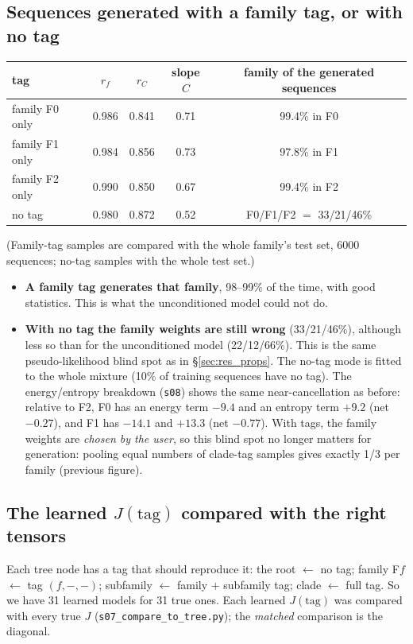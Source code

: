 \subsection{Sequences generated with a family tag, or with no tag}
\begin{center}\small
\begin{tabular}{lccccc}
\toprule
tag & $r_f$ & $r_C$ & slope $C$ & \multicolumn{2}{c}{family of the generated sequences}\\
\midrule
family F0 only & 0.986 & 0.841 & 0.71 & \multicolumn{2}{c}{99.4\% in F0}\\
family F1 only & 0.984 & 0.856 & 0.73 & \multicolumn{2}{c}{97.8\% in F1}\\
family F2 only & 0.990 & 0.850 & 0.67 & \multicolumn{2}{c}{99.4\% in F2}\\
no tag & 0.980 & 0.872 & 0.52 & \multicolumn{2}{c}{F0/F1/F2 $=$ 33/21/46\%}\\
\bottomrule
\end{tabular}
\end{center}
(Family-tag samples are compared with the whole family's test set, 6000 sequences; no-tag samples with the
whole test set.)
\begin{itemize}
\item \textbf{A family tag generates that family}, 98--99\% of the time, with good statistics. This is
      what the unconditioned model could not do.
\item \textbf{With no tag the family weights are still wrong} (33/21/46\%), although less so than for the
      unconditioned model (22/12/66\%). This is the same pseudo-likelihood blind spot as in
      \S\ref{sec:res_props}. The no-tag mode is fitted to the whole mixture (10\% of training sequences have no
      tag). The energy/entropy breakdown (\texttt{s08}) shows the same near-cancellation as before: relative to F2, F0
      has an energy term $-9.4$ and an entropy term $+9.2$ (net $-0.27$), and F1 has $-14.1$ and $+13.3$ (net
      $-0.77$). With tags, the family weights are \emph{chosen by the user}, so this blind spot no longer matters for
      generation: pooling equal numbers of clade-tag samples gives exactly 1/3 per family (previous figure).
\end{itemize}

\subsection{The learned $J(\text{tag})$ compared with the right tensors}
Each tree node has a tag that should reproduce it: the root $\leftarrow$ no tag; family F$f$ $\leftarrow$
tag $(f,-,-)$; subfamily $\leftarrow$ family $+$ subfamily tag; clade $\leftarrow$ full tag. So we have 31
learned models for 31 true ones. Each learned $J(\text{tag})$ was compared with every true $J$
(\texttt{s07\_compare\_to\_tree.py}); the \emph{matched} comparison is the diagonal.

